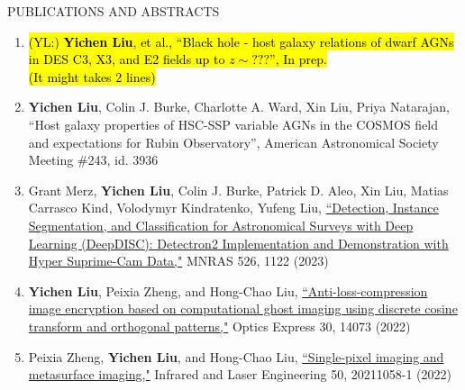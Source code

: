 \documentclass[10pt]{article} %
\DeclareRobustCommand{\yichen}[1]{{\sethlcolor{lime}\hl{(YL:) #1}}}
\begin{document}
\begin{section}{PUBLICATIONS AND ABSTRACTS}
    
\begin{enumerate}[leftmargin=1.5em]
    \item \yichen{\textbf{Yichen Liu}, et al., ``Black hole - host galaxy relations of dwarf AGNs in DES C3, X3, and E2 fields up to $z\sim???$'', In prep. \\ (It might takes 2 lines)}
    \item \textbf{Yichen Liu}, Colin J. Burke, Charlotte A. Ward, Xin Liu, Priya Natarajan, ``Host galaxy properties of HSC-SSP variable AGNs in the COSMOS field and expectations for Rubin Observatory'', American Astronomical Society Meeting \#243, id. 3936
    \item Grant Merz, \textbf{Yichen Liu}, Colin J. Burke, Patrick D. Aleo, Xin Liu, Matias Carrasco Kind, Volodymyr Kindratenko, Yufeng Liu, \href{https://academic.oup.com/mnras/advance-article-abstract/doi/10.1093/mnras/stad2785/7273850?redirectedFrom=fulltext}{``Detection, Instance Segmentation, and Classification for Astronomical Surveys with Deep Learning (DeepDISC): Detectron2 Implementation and Demonstration with Hyper Suprime-Cam Data,"} MNRAS 526, 1122 (2023)
    \item \textbf{Yichen Liu}, Peixia Zheng, and Hong-Chao Liu, \href{https://opg.optica.org/oe/fulltext.cfm?uri=oe-30-9-14073&id=471300}{``Anti-loss-compression image encryption based on computational ghost imaging using discrete cosine transform and orthogonal patterns,"} Optics Express 30, 14073 (2022)
    \item Peixia Zheng, \textbf{Yichen Liu}, and Hong-Chao Liu, \href{http://www.irla.cn/cn/article/doi/10.3788/IRLA20211058}{``Single-pixel imaging and metasurface imaging,"} Infrared and Laser Engineering 50, 20211058-1 (2022)
\end{enumerate}

\end{section}
\end{document}
